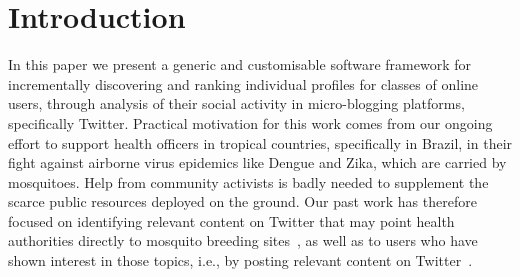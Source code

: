 \documentclass[runningheads]{llncs}
\begin{document}
%

\section{Introduction}

In this paper we present a generic and customisable software framework for incrementally discovering and ranking individual profiles for classes of online users, through analysis of their social activity in micro-blogging platforms, specifically Twitter.
Practical motivation for this work comes from our ongoing effort to support health officers in tropical countries, specifically in Brazil, in their fight against airborne virus epidemics like Dengue and Zika, which are carried by mosquitoes. Help from community activists is badly needed to supplement the scarce public resources deployed on the ground. Our past work has therefore focused on identifying relevant content on Twitter that may point health authorities directly to mosquito breeding sites~\cite{Sousa2018}, as well as to users who have shown interest in those topics, i.e., by posting relevant content on Twitter~\cite{Missier2017}. 
\end{document}
